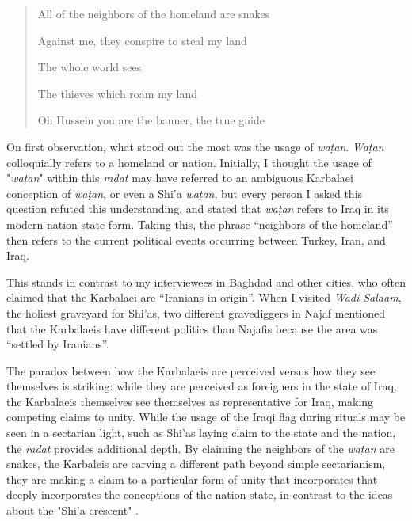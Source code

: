 






\begin{quote}
All of the neighbors of the homeland are snakes

Against me, they conspire to steal my land

The whole world sees

The thieves which roam my land

Oh Hussein you are the banner, the true guide
\end{quote}

On first observation, what stood out the most was the usage of \emph{waṭan}. \emph{Waṭan} colloquially refers to a homeland or nation. Initially, I thought the usage of "\emph{waṭan}" within this \emph{radat} may have referred to an ambiguous Karbalaei conception of \emph{waṭan}, or even a Shi'a \emph{waṭan}, but every person I asked this question refuted this understanding, and stated that \emph{waṭan} refers to Iraq in its modern nation-state form. Taking this, the phrase “neighbors of the homeland” then refers to the current political events occurring between Turkey, Iran, and Iraq. 

This stands in contrast to my interviewees in Baghdad and other cities, who often claimed that the Karbalaei are “Iranians in origin”. When I visited \emph{Wadi Salaam}, the holiest graveyard for Shi'as, two different gravediggers in Najaf mentioned that the Karbalaeis have different politics than Najafis because the area was “settled by Iranians”. 

The paradox between how the Karbalaeis are perceived versus how they see themselves is striking: while they are perceived as foreigners in the state of Iraq, the Karbalaeis themselves see themselves as representative for Iraq, making competing claims to unity. While the usage of the Iraqi flag during rituals may be seen in a sectarian light, such as Shi'as laying claim to the state and the nation, the \emph{radat} provides additional depth. By claiming the neighbors of the \emph{waṭan} are snakes, the Karbaleis are carving a different path beyond simple sectarianism, they are making a claim to a particular form of unity that incorporates that deeply incorporates the conceptions of the nation-state, in contrast to the ideas about the "Shi'a crescent" \cite[120]{haddad_understanding_2020}. 

